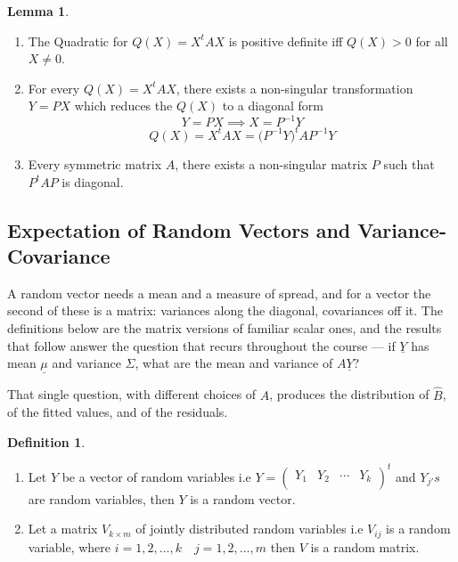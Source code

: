 \documentclass[11pt,a4paper]{article}
\theoremstyle{definition}
\newtheorem{defn}[thm]{Definition}
\newtheorem{lem}[thm]{Lemma}
\begin{document}
\begin{lem}\label{res:lem:1.1.7}
\begin{enumerate}
\item[i.] The Quadratic for $Q(X)=X^tAX$ is positive definite iff $Q(X)>0$ for all $X\neq 0$.
\item[ii.] For every $Q(X)=X^tAX$, there exists a non-singular transformation $Y=PX$ which reduces the $Q(X)$ to a diagonal form $$Y=PX\implies X=P^{-1}Y$$
$$Q(X)=X^tAX=\big(P^{-1}Y\big)^tAP^{-1}Y$$
\item[iii.] Every symmetric matrix $A$, there exists a non-singular matrix $P$ such that $P^tAP$ is diagonal.\\
\end{enumerate}
\end{lem}


\subsection{Expectation of Random Vectors and Variance-Covariance}
A random vector needs a mean and a measure of spread, and for a vector the
second of these is a matrix: variances along the diagonal, covariances off it.
The definitions below are the matrix versions of familiar scalar ones, and the
results that follow answer the question that recurs throughout the course ---
if $\underline{Y}$ has mean $\underline{\mu}$ and variance $\Sigma$, what are
the mean and variance of $A\underline{Y}$?

That single question, with different choices of $A$, produces the distribution
of $\widehat{B}$, of the fitted values, and of the residuals.

\begin{defn}\label{res:defn:1.2.1}
\begin{enumerate}
\item[i.] Let $Y$ be a vector of random variables i.e $Y=
\begin{pmatrix}
Y_1 & Y_2 & \cdots & Y_k\\
\end{pmatrix}^t
$ and $Y_{j'}s$ are random variables, then $Y$ is a random vector.
\item[ii.] Let a matrix $V_{k\times m}$ of jointly distributed random variables i.e $V_{ij}$ is a random variable, where $i=1,2,\ldots , k\quad  j=1,2,\ldots ,m$ then $V$ is a random matrix.\\
\end{enumerate}
\end{defn}
\end{document}
